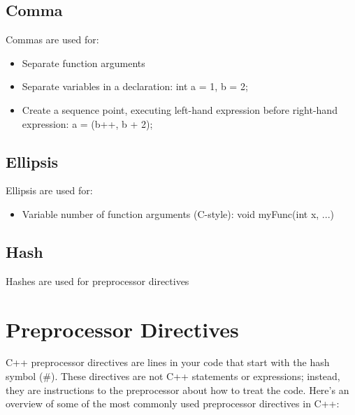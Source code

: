 \documentclass{report}
\begin{document}
    \bigbreak \noindent \bigbreak \noindent
    \begin{minipage}[t]{0.47\textwidth}
    \subsection{Comma}
    \bigbreak \noindent 
    Commas are used for:
    \begin{itemize}
        \item Separate function arguments
        \item Separate variables in a declaration: int a = 1, b = 2;
        \item Create a sequence point, executing left-hand expression before right-hand expression: a = (b++, b + 2);
    \end{itemize}
    \end{minipage}
    \begin{minipage}[t]{0.47\textwidth}
    \subsection{Ellipsis}
    \bigbreak \noindent 
    Ellipsis are used for:
    \begin{itemize}
        \item Variable number of function arguments (C-style): void myFunc(int x, ...)
    \end{itemize}
    \end{minipage}
    \bigbreak \noindent 
    \begin{minipage}[t]{0.47\textwidth}
        \subsection{Hash}
        \bigbreak \noindent 
        Hashes are used for preprocessor  directives
    \end{minipage}



    \pagebreak \bigbreak \noindent 
    \section{Preprocessor Directives}
    \bigbreak \noindent 
    C++ preprocessor directives are lines in your code that start with the hash symbol (\#). These directives are not C++ statements or expressions; instead, they are instructions to the preprocessor about how to treat the code. Here's an overview of some of the most commonly used preprocessor directives in C++:
    \bigbreak \noindent 
\end{document}
